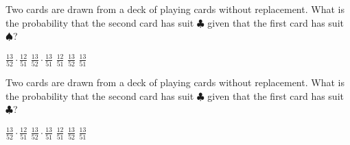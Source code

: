 \documentclass[answers,12pt]{exam}
\begin{document}
\begin{questions}
\question Two cards are drawn from a deck of playing cards
without replacement. What is the probability that
the second card has suit $\clubsuit$ given that the
first card has suit $\spadesuit$?\\
\begin{oneparchoices}
\choice $\frac{13}{52}\cdot\frac{12}{51}$
\choice $\frac{13}{52}\cdot\frac{13}{51}$
\choice $\frac{12}{51}$
\choice $\frac{13}{52}$
\correctchoice $\frac{13}{51}$
\end{oneparchoices}

\question Two cards are drawn from a deck of playing cards
without replacement. What is the probability that
the second card has suit $\clubsuit$ given that the
first card has suit $\clubsuit$?\\
\begin{oneparchoices}
\choice $\frac{13}{52}\cdot\frac{12}{51}$
\choice $\frac{13}{52}\cdot\frac{13}{51}$
\correctchoice $\frac{12}{51}$
\choice $\frac{13}{52}$
\choice $\frac{13}{51}$
\end{oneparchoices}

\end{questions}
\end{document}
